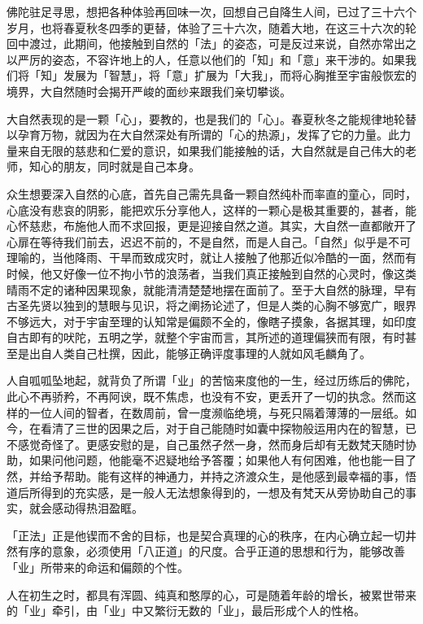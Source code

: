 \documentclass[12pt,twoside,openany]{book}
\begin{document}
佛陀驻足寻思，想把各种体验再回味一次，回想自己自降生人间，已过了三十六个岁月，也将春夏秋冬四季的更替，体验了三十六次，随着大地，在这三十六次的轮回中渡过，此期间，他接触到自然的「法」的姿态，可是反过来说，自然亦常出之以严厉的姿态，不容许地上的人，任意以他们的「知」和「意」来干涉的。如果我们将「知」发展为「智慧」，将「意」扩展为「大我」，而将心胸推至宇宙般恢宏的境界，大自然随时会揭开严峻的面纱来跟我们亲切攀谈。

大自然表现的是一颗「心」，要教的，也是我们的「心」。春夏秋冬之能规律地轮替以孕育万物，就因为在大自然深处有所谓的「心的热源」，发挥了它的力量。此力量来自无限的慈悲和仁爱的意识，如果我们能接触的话，大自然就是自己伟大的老师，知心的朋友，同时就是自己本身。

众生想要深入自然的心底，首先自己需先具备一颗自然纯朴而率直的童心，同时，心底没有悲哀的阴影，能把欢乐分享他人，这样的一颗心是极其重要的，甚者，能心怀慈悲，布施他人而不求回报，更是迎接自然之道。其实，大自然一直都敞开了心扉在等待我们前去，迟迟不前的，不是自然，而是人自己。「自然」似乎是不可理喻的，当他降雨、干旱而致成灾时，就让人接触了他那近似冷酷的一面，然而有时候，他又好像一位不拘小节的浪荡者，当我们真正接触到自然的心灵时，像这类晴雨不定的诸种因果现象，就能清清楚楚地摆在面前了。至于大自然的脉理，早有古圣先贤以独到的慧眼与见识，将之阐扬论述了，但是人类的心胸不够宽广，眼界不够远大，对于宇宙至理的认知常是偏颇不全的，像瞎子摸象，各据其理，如印度自古即有的吠陀，五明之学，就整个宇宙而言，其所述的道理偏狭而有限，有时甚至是出自人类自己杜撰，因此，能够正确评度事理的人就如风毛麟角了。

人自呱呱坠地起，就背负了所谓「业」的苦恼来度他的一生，经过历练后的佛陀，此心不再骄矜，不再阿谀，既不焦虑，也没有不安，更丢开了一切的执念。然而这样的一位人间的智者，在数周前，曾一度濒临绝境，与死只隔着薄薄的一层纸。如今，在看清了三世的因果之后，对于自己能随时如囊中探物般运用内在的智慧，已不感觉奇怪了。更感安慰的是，自己虽然孑然一身，然而身后却有无数梵天随时协助，如果问他问题，他能毫不迟疑地给予答覆；如果他人有何困难，他也能一目了然，并给予帮助。能有这样的神通力，并持之济渡众生，是他感到最幸福的事，悟道后所得到的充实感，是一般人无法想象得到的，一想及有梵天从旁协助自己的事实，就会感动得热泪盈眶。

「正法」正是他锲而不舍的目标，也是契合真理的心的秩序，在内心确立起一切井然有序的意象，必须使用「八正道」的尺度。合乎正道的思想和行为，能够改善「业」所带来的命运和偏颇的个性。

人在初生之时，都具有浑圆、纯真和憨厚的心，可是随着年龄的增长，被累世带来的「业」牵引，由「业」中又繁衍无数的「业」，最后形成个人的性格。
\end{document}
